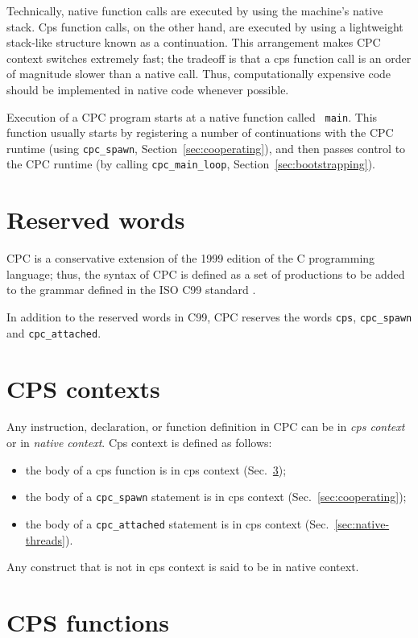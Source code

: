 \documentclass[a4paper]{report}
\begin{document}
Technically, native function calls are executed by using the machine's
native stack.  Cps function calls, on the other hand, are executed by
using a lightweight stack-like structure known as a continuation.
This arrangement makes CPC context switches extremely fast; the
tradeoff is that a cps function call is an order of magnitude slower
than a native call.  Thus, computationally expensive code should be
implemented in native code whenever possible.

Execution of a CPC program starts at a native function called {\tt
  main}.  This function usually starts by registering a number of
continuations with the CPC runtime (using {\tt cpc\_spawn},
Section~\ref{sec:cooperating}), and then passes control to the CPC
runtime (by calling {\tt cpc\_main\_loop}, Section~\ref{sec:bootstrapping}).

\section{Reserved words}

CPC is a conservative extension of the 1999 edition of the C programming
language; thus, the syntax of CPC is defined as a set of productions to be
added to the grammar defined in the ISO C99 standard \cite{iso:c99}.

In addition to the reserved words in C99, CPC reserves the words
{\tt cps}, {\tt cpc\_spawn} and {\tt cpc\_attached}.

\section{CPS contexts} \label{sec:contexts}

Any instruction, declaration, or function definition in CPC can be in
{\em cps context\/} or in {\em native context}.  Cps context is
defined as follows:
\begin{itemize}
\item the body of a cps function is in cps context
  (Sec.~\ref{sec:cpc-functions});
\item the body of a {\tt cpc\_spawn} statement is in cps context
  (Sec.~\ref{sec:cooperating});
\item the body of a {\tt cpc\_attached} statement is in cps context
  (Sec.~\ref{sec:native-threads}).
\end{itemize}
Any construct that is not in cps context is said to be in native context.

\section{CPS functions} \label{sec:cpc-functions}
\end{document}
